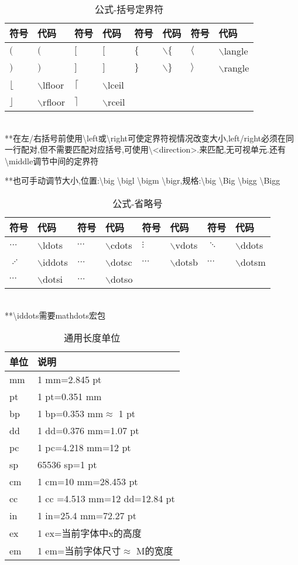 \documentclass[UTF8,fontset=ubuntu]{ctexart}
\begin{document}
\begin{table}[H]
\begin{tabular}{l l l l l l l l}
	\hline
	符号 & 代码 & 符号 & 代码 & 符号 & 代码 & 符号 & 代码\\\hline
	$($ & $($ & $[$ & $[$ & $\{$ & $\backslash\{$ & $\langle$ & $\backslash$langle\\
	$)$ & $)$ & $]$ & $]$ & $\}$ & $\backslash\}$ & $\rangle$ & $\backslash$rangle\\
	$\lfloor$ & $\backslash$lfloor & $\lceil$ & $\backslash$lceil\\
	$\rfloor$ & $\backslash$rfloor & $\rceil$ & $\backslash$rceil\\
	\hline
\end{tabular}\\[2mm]
**在左/右括号前使用\textbackslash left或\textbackslash right可使定界符视情况改变大小,left/right必须在同一行配对,但不需要匹配对应括号,可使用\textbackslash\textless direction\textgreater.来匹配,无可视单元.还有\textbackslash middle调节中间的定界符\par
**也可手动调节大小,位置:\textbackslash big \textbackslash bigl \textbackslash bigm \textbackslash bigr,规格:\textbackslash big \textbackslash Big \textbackslash bigg \textbackslash Bigg
\caption{公式-括号定界符}
\end{table}
\begin{table}[H]
\begin{tabular}{l l l l l l l l}
	\hline
	符号 & 代码 & 符号 & 代码 & 符号 & 代码 & 符号 & 代码\\
	\hline
	$\ldots$ & $\backslash$ldots & $\cdots$ & $\backslash$cdots & $\vdots$ & $\backslash$vdots & $\ddots$ & $\backslash$ddots\\
	$\iddots$ & $\backslash$iddots & $\dotsc$ & $\backslash$dotsc & $\dotsb$ & $\backslash$dotsb & $\dotsm$ & $\backslash$dotsm\\
	$\dotsi$ & $\backslash$dotsi & $\dotso$ & $\backslash$dotso\\
	\hline
\end{tabular}\\[2mm]
**\textbackslash iddots需要mathdots宏包
\caption{公式-省略号}
\end{table}
\begin{table}[H]
\begin{tabular}{l l}
	\hline
	单位 & 说明\\
	\hline
	mm & 1 mm=2.845 pt\\
	pt & 1 pt=0.351 mm\\
	bp & 1 bp=0.353 mm$\approx$ 1 pt\\
	dd & 1 dd=0.376 mm=1.07 pt\\
	pc & 1 pc=4.218 mm=12 pt\\
	sp & 65536 sp=1 pt\\
	cm & 1 cm=10 mm=28.453 pt\\
	cc & 1 cc =4.513 mm=12 dd=12.84 pt\\
	in & 1 in=25.4 mm=72.27 pt\\
	ex & 1 ex=当前字体中x的高度\\
	em & 1 em=当前字体尺寸$\approx$ M的宽度\\
	\hline
\end{tabular}
\caption{通用长度单位}
\end{table}
\end{document}
